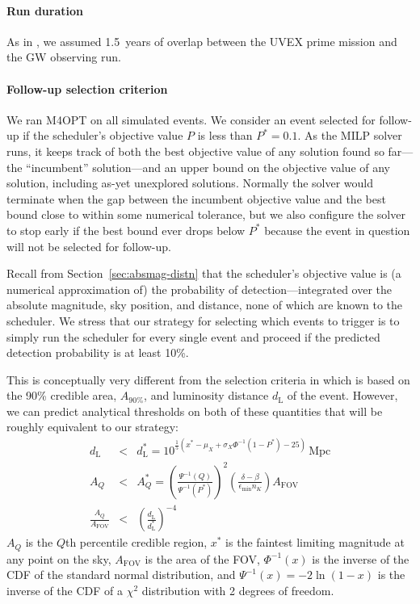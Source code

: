 \documentclass[twocolumn,times]{aastex631}
\begin{document}
\paragraph{Run duration}
As in \citet{2025arXiv250114109C}, we assumed 1.5~years of overlap between the \ac{UVEX} prime mission and the \ac{GW} observing run.

\paragraph{Follow-up selection criterion}
We ran \ac{M4OPT} on all simulated events. We consider an event selected for follow-up if the scheduler's objective value $P$ is less than $P^* = 0.1$. As the \ac{MILP} solver runs, it keeps track of both the best objective value of any solution found so far---the ``incumbent'' solution---and an upper bound on the objective value of any solution, including as-yet unexplored solutions. Normally the solver would terminate when the gap between the incumbent objective value and the best bound close to within some numerical tolerance, but we also configure the solver to stop early if the best bound ever drops below $P^*$ because the event in question will not be selected for follow-up.

Recall from Section~\ref{sec:absmag-distn} that the scheduler's objective value is (a numerical approximation of) the probability of detection---integrated over the absolute magnitude, sky position, and distance, none of which are known to the scheduler. We stress that our strategy for selecting which events to trigger is to simply run the scheduler for every single event and proceed if the predicted detection probability is at least 10\%.

This is conceptually very different from the selection criteria in \citet{2025arXiv250114109C} which is based on the 90\% credible area, $A_\mathrm{90\%}$, and luminosity distance $d_\mathrm{L}$ of the event. However, we can predict analytical thresholds on both of these quantities that will be roughly equivalent to our strategy:
%
\begin{eqnarray}
    d_\mathrm{L} &<& d_\mathrm{L}^* = 10^{\frac{1}{5}(x^* - \mu_X + \sigma_X \Phi^{-1}(1-P^*) - 25)}\,\mathrm{Mpc} \label{eq:threshold-distance} \\
    A_Q &<& A_Q^* = \left(\frac{\Psi^{-1}(Q)}{\Psi^{-1}(P^*)}\right)^2 \left(\frac{\delta - \beta}{\epsilon_\mathrm{min} n_K}\right)A_\mathrm{FOV} \label{eq:threshold-area} \\
    \frac{A_Q}{A_\mathrm{FOV}} &<& \left(\frac{d_\mathrm{L}}{d_\mathrm{L}^*}\right)^{-4} \label{eq:threshold-area-distance}
\end{eqnarray}
%
$A_Q$ is the $Q$th percentile credible region, $x^*$ is the faintest limiting magnitude at any point on the sky, $A_\mathrm{FOV}$ is the area of the \ac{FOV}, $\Phi^{-1}(x)$ is the inverse of the \ac{CDF} of the standard normal distribution, and $\Psi^{-1}(x) = -2\ln(1 - x)$ is the inverse of the \ac{CDF} of a $\chi^2$ distribution with 2 degrees of freedom.
\end{document}
